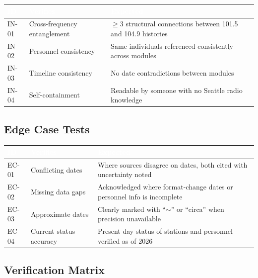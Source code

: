 \documentclass[11pt,letterpaper]{article}
\newcommand{\tableheader}[1]{\textbf{\sffamily\textcolor{white}{#1}}}
\begin{document}
\begin{center}
\begin{tabularx}{\textwidth}{C{1.2cm}L{3.5cm}X}
\toprule
{}
\tableheader{ID} & \tableheader{Verifies} & \tableheader{Expected} \\
\midrule
IN-01 & Cross-frequency entanglement & $\geq$3 structural connections between 101.5 and 104.9 histories \\
IN-02 & Personnel consistency & Same individuals referenced consistently across modules \\
IN-03 & Timeline consistency & No date contradictions between modules \\
IN-04 & Self-containment & Readable by someone with no Seattle radio knowledge \\
\bottomrule
\end{tabularx}
\end{center}

\subsection{Edge Case Tests}

\begin{center}
\begin{tabularx}{\textwidth}{C{1.2cm}L{3.5cm}X}
\toprule
{}
\tableheader{ID} & \tableheader{Verifies} & \tableheader{Expected} \\
\midrule
EC-01 & Conflicting dates & Where sources disagree on dates, both cited with uncertainty noted \\
EC-02 & Missing data gaps & Acknowledged where format-change dates or personnel info is incomplete \\
EC-03 & Approximate dates & Clearly marked with ``$\sim$'' or ``circa'' when precision unavailable \\
EC-04 & Current status accuracy & Present-day status of stations and personnel verified as of 2026 \\
\bottomrule
\end{tabularx}
\end{center}

\subsection{Verification Matrix}
\end{document}

